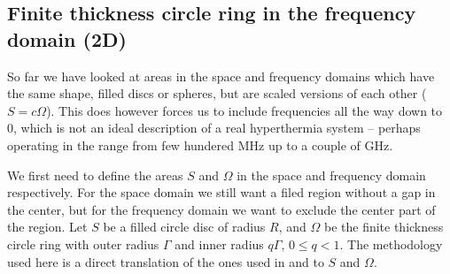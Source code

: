 \documentclass[11pt,a4paper, 
swedish, english %
]{article}
\begin{document}
\cite{PSWF-I_1961, PSWF-II_1961, PSWF-III_1962, PSWF-IV_1964, PSWF-V_1978}

\subsection{Finite thickness circle ring in the frequency domain (2D)}
So far we have looked at areas in the space and frequency domains
which have the same shape, filled discs or spheres, but are scaled
versions of each other ($S=c\Omega$). This does however forces us to
include frequencies all the way down to 0, which is not an ideal
description of a real hyperthermia system -- perhaps operating in the
range from few hundered MHz up to a couple of GHz.

We first need to define the areas $S$ and $\Omega$ in the space and
frequency domain respectively. For the space domain we still want a
filed region without a gap in the center, but for the frequency domain
we want to exclude the center part of the region. Let $S$ be a filled
circle disc of radius $R$, and $\Omega$ be the finite thickness circle
ring with outer radius $\Gamma$ and inner radius $q\Gamma$, $0\le q<1$.
The methodology used here is a direct translation of the ones used in
\cite{PSWF-I_1961} and \cite{PSWF-IV_1964} to $S$ and $\Omega$.
\end{document}
